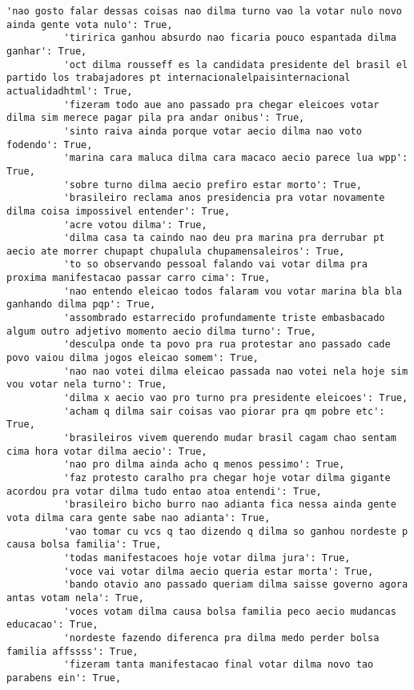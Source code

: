 \documentclass[11pt]{article}
\begin{document}
\begin{Verbatim}[commandchars=\\\{\}]
          'nao gosto falar dessas coisas nao dilma turno vao la votar nulo novo ainda gente vota nulo': True,
          'tiririca ganhou absurdo nao ficaria pouco espantada dilma ganhar': True,
          'oct dilma rousseff es la candidata presidente del brasil el partido los trabajadores pt internacionalelpaisinternacional actualidadhtml': True,
          'fizeram todo aue ano passado pra chegar eleicoes votar dilma sim merece pagar pila pra andar onibus': True,
          'sinto raiva ainda porque votar aecio dilma nao voto fodendo': True,
          'marina cara maluca dilma cara macaco aecio parece lua wpp': True,
          'sobre turno dilma aecio prefiro estar morto': True,
          'brasileiro reclama anos presidencia pra votar novamente dilma coisa impossivel entender': True,
          'acre votou dilma': True,
          'dilma casa ta caindo nao deu pra marina pra derrubar pt aecio ate morrer chupapt chupalula chupamensaleiros': True,
          'to so observando pessoal falando vai votar dilma pra proxima manifestacao passar carro cima': True,
          'nao entendo eleicao todos falaram vou votar marina bla bla ganhando dilma pqp': True,
          'assombrado estarrecido profundamente triste embasbacado algum outro adjetivo momento aecio dilma turno': True,
          'desculpa onde ta povo pra rua protestar ano passado cade povo vaiou dilma jogos eleicao somem': True,
          'nao nao votei dilma eleicao passada nao votei nela hoje sim vou votar nela turno': True,
          'dilma x aecio vao pro turno pra presidente eleicoes': True,
          'acham q dilma sair coisas vao piorar pra qm pobre etc': True,
          'brasileiros vivem querendo mudar brasil cagam chao sentam cima hora votar dilma aecio': True,
          'nao pro dilma ainda acho q menos pessimo': True,
          'faz protesto caralho pra chegar hoje votar dilma gigante acordou pra votar dilma tudo entao atoa entendi': True,
          'brasileiro bicho burro nao adianta fica nessa ainda gente vota dilma cara gente sabe nao adianta': True,
          'vao tomar cu vcs q tao dizendo q dilma so ganhou nordeste p causa bolsa familia': True,
          'todas manifestacoes hoje votar dilma jura': True,
          'voce vai votar dilma aecio queria estar morta': True,
          'bando otavio ano passado queriam dilma saisse governo agora antas votam nela': True,
          'voces votam dilma causa bolsa familia peco aecio mudancas educacao': True,
          'nordeste fazendo diferenca pra dilma medo perder bolsa familia affssss': True,
          'fizeram tanta manifestacao final votar dilma novo tao parabens ein': True,

\end{Verbatim}
\end{document}
